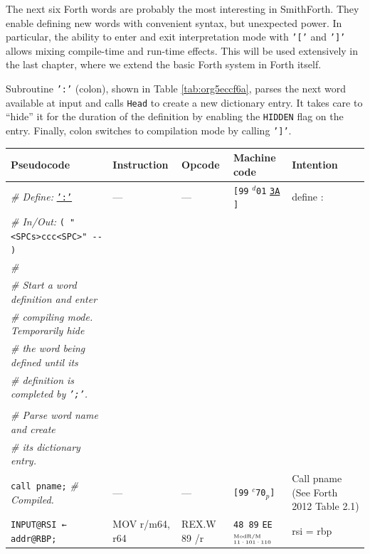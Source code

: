 \documentclass[a4paper,12pt,final]{article}
\begin{document}
The next six Forth words are probably the most interesting in
SmithForth.  They enable defining new words with convenient syntax,
but unexpected power.  In particular, the ability to enter and exit
interpretation mode with \texttt{'['} and \texttt{']'} allows mixing compile-time
and run-time effects.  This will be used extensively in the last
chapter, where we extend the basic Forth system in Forth itself.

Subroutine \texttt{':'} (colon), shown in Table \ref{tab:org5eccf6a}, parses the
next word available at input and calls \texttt{Head} to create a new
dictionary entry.  It takes care to ``hide'' it for the duration of
the definition by enabling the \texttt{HIDDEN} flag on the entry.  Finally,
colon switches to compilation mode by calling \texttt{']'}.

\begin{table}[!htbp] \begin{adjustwidth}{-1cm}{-1cm} \fontsize{10}{12.000000}\selectfont
\begin{center}
\begin{tabular}{l|ll|lH}
\textbf{Pseudocode} & \textbf{Instruction} & \textbf{Opcode} & \textbf{Machine code} & \textbf{Intention}\\[0pt]
\hline
\emph{\# Define:} \uline{\texttt{':'}} & --- & --- & \texttt{[99} \(^{d}\)​\texttt{01} \uline{\texttt{3A}}​\texttt{]} & define :\\[0pt]
\emph{\# In/Out:} \texttt{( "<SPCs>ccc<SPC>" -​- )} &  &  &  & \\[0pt]
\emph{\#} &  &  &  & \\[0pt]
\emph{\# Start a word definition and enter} &  &  &  & \\[0pt]
\emph{\# compiling mode. Temporarily hide} &  &  &  & \\[0pt]
\emph{\# the word being defined until its} &  &  &  & \\[0pt]
\emph{\# definition is completed by \texttt{';'}.} &  &  &  & \\[0pt]
 &  &  &  & \\[0pt]
\emph{\# Parse word name and create} &  &  &  & \\[0pt]
\emph{\# its dictionary entry.} &  &  &  & \\[0pt]
\texttt{call pname;}  \emph{\# Compiled.} & --- & --- & \texttt{[99} \(^{c}\)​\texttt{70}​\(_{p}\)​\texttt{]} & Call pname  (See Forth 2012 Table 2.1)\\[0pt]
\texttt{INPUT@RSI ← addr@RBP;} & MOV r/m64, r64 & REX.W 89 /r & \texttt{48 89} \texttt{EE}​\(^{\text{\tiny ModR/M}}_{\text{\tiny 11·101·110}}\) & rsi = rbp\\[0pt]

\end{tabular}
\end{center}
\end{adjustwidth}
\end{table}
\end{document}
